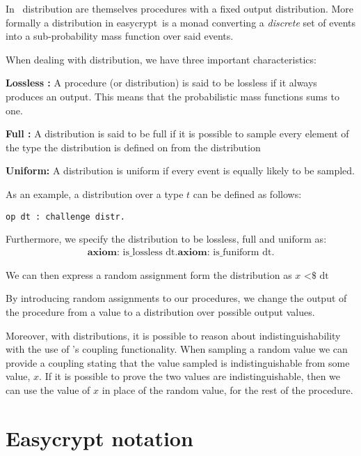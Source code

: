 In \easycrypt\ distribution are themselves procedures with a fixed output
distribution. More formally a distribution in easycrypt\ is a monad converting a
\textit{discrete} set of events into a sub-probability mass function over said events.

When dealing with distribution, we have three important characteristics:

\noindent \textbf{Lossless :} A procedure (or distribution) is said to be
lossless if it always produces an output. This means that the
probabilistic mass functions sums to one.

\noindent \textbf{Full :} A distribution is said to be full if it is
possible to sample every element of the type the distribution is defined on from
the distribution

\noindent \textbf{Uniform: } A distribution is uniform if every event is equally
likely to be sampled.

As an example, a distribution over a type $t$ can be defined as follows:
\begin{lstlisting}[frame=none]
op dt : challenge distr.
\end{lstlisting}
Furthermore, we specify the distribution to be lossless, full and uniform as:
\begin{gather*}
  \textbf{axiom: } \text{is\_lossless dt}.
  \textbf{axiom: } \text{is\_funiform dt}.
\end{gather*}

We can then express a random assignment form the distribution as $x \text{ <\$} \text{ dt}$


By introducing random assignments to our procedures, we change
the output of the procedure from a value to a distribution over possible output values.

Moreover, with distributions, it is possible to reason about indistinguishability
with the use of \easycrypt's coupling functionality. When sampling a random
value we can provide a coupling stating that the value sampled is
indistinguishable from some value, $x$. If it is possible to prove the two
values are indistinguishable, then we can use the value of $x$ in place of the
random value, for the rest of the procedure.


\section{Easycrypt notation}
\label{sec:label}

